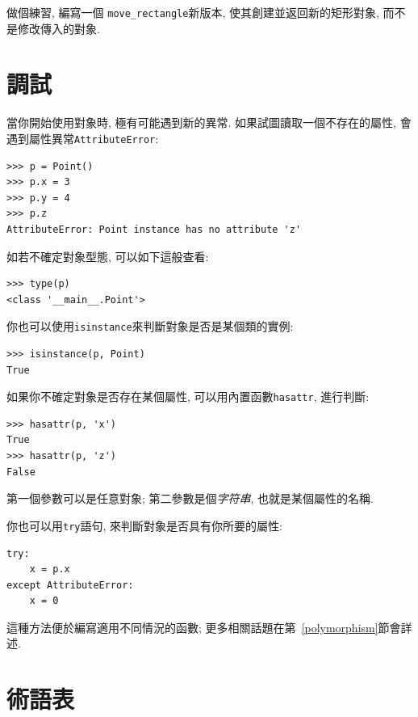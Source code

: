 \documentclass[10pt]{book}
\begin{document}
做個練習, 編寫一個 \verb"move_rectangle"新版本, 
使其創建並返回新的矩形對象, 而不是修改傳入的對象. 

\section{調試}
\label{hasattr}

當你開始使用對象時, 極有可能遇到新的異常. 
如果試圖讀取一個不存在的屬性, 會遇到屬性異常{\tt AttributeError}:

\begin{verbatim}
>>> p = Point()
>>> p.x = 3
>>> p.y = 4
>>> p.z
AttributeError: Point instance has no attribute 'z'
\end{verbatim}
%
如若不確定對象型態, 可以如下這般查看:

\begin{verbatim}
>>> type(p)
<class '__main__.Point'>
\end{verbatim}
%
你也可以使用{\tt isinstance}來判斷對象是否是某個類的實例:

\begin{verbatim}
>>> isinstance(p, Point)
True
\end{verbatim}
%
如果你不確定對象是否存在某個屬性, 
可以用內置函數{\tt hasattr}, 進行判斷:

\begin{verbatim}
>>> hasattr(p, 'x')
True
>>> hasattr(p, 'z')
False
\end{verbatim}
%
第一個參數可以是任意對象;
第二參數是個{\em 字符串}, 也就是某個屬性的名稱. 

你也可以用{\tt try}語句, 來判斷對象是否具有你所要的屬性:

\begin{verbatim}
try:
    x = p.x
except AttributeError:
    x = 0
\end{verbatim}

這種方法便於編寫適用不同情況的函數;
更多相關話題在第~\ref{polymorphism}節會詳述. 


\section{術語表}
\end{document}
